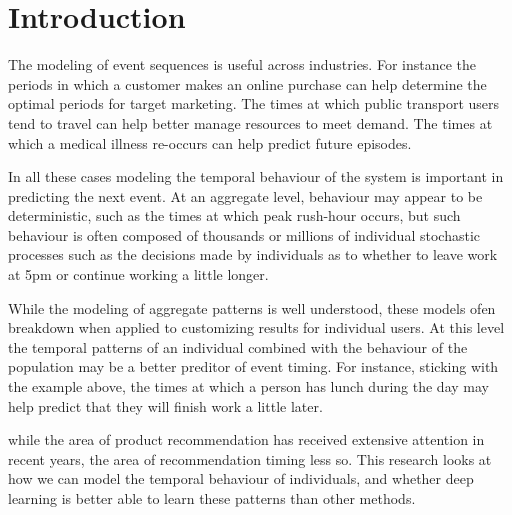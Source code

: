 
\chapter{Introduction} %

\label{Chapter1} %


\newcommand{\keyword}[1]{\textbf{#1}}
\newcommand{\tabhead}[1]{\textbf{#1}}
\newcommand{\code}[1]{\texttt{#1}}
\newcommand{\file}[1]{\texttt{\bfseries#1}}
\newcommand{\option}[1]{\texttt{\itshape#1}}


The modeling of event sequences is useful across industries. For instance the periods in which a customer makes an online purchase can help determine the optimal periods for target marketing. The times at which public transport users tend to travel can help better manage resources to meet demand. The times at which a medical illness re-occurs can help predict future episodes.
 
In all these cases modeling the temporal behaviour of the system is important in predicting the next event. At an aggregate level, behaviour may appear to be deterministic, such as the times at which peak rush-hour occurs, but such behaviour is often composed of thousands or millions of individual stochastic processes such as the decisions made by individuals as to whether to leave work at 5pm or continue working a little longer.

While the modeling of aggregate patterns is well understood, these models ofen breakdown when applied to customizing results for individual users. At this level the temporal patterns of an individual combined with the behaviour of the population may be a better preditor of event timing. For instance, sticking with the example above, the times at which a person has lunch during the day may help predict that they will finish work a little later.

while the area of product recommendation has received extensive attention in recent years, the area of recommendation timing less so. This research looks at how we can model the temporal behaviour of individuals, and whether deep learning is better able to learn these patterns than other methods.

